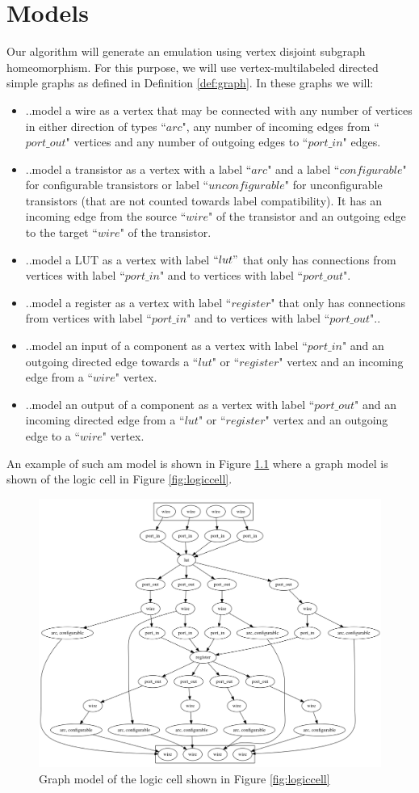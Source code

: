 \chapter{Models}
Our algorithm will generate an emulation using vertex disjoint subgraph homeomorphism. For this purpose, we will use vertex-multilabeled directed simple graphs as defined in Definition \ref{def:graph}. In these graphs we will:

\begin{itemize}
\item ..model a wire as a vertex that may be connected with any number of vertices in either direction of types ``$arc$", any number of incoming edges from ``$port\_out$" vertices and any number of outgoing edges to ``$port\_in$" edges.
\item ..model a transistor as a vertex with a label ``$arc$" and a label ``$configurable$" for configurable transistors or label ``$unconfigurable$" for unconfigurable transistors (that are not counted towards label compatibility). It has an incoming edge from the source ``$wire$" of the transistor and an outgoing edge to the target ``$wire$" of the transistor.
\item ..model a LUT as a vertex with label $``lut"$ that only has connections from vertices with label ``$port\_in$" and to vertices with label ``$port\_out$".
\item ..model a register as a vertex with label ``$register$" that only has connections from vertices with label ``$port\_in$" and to vertices with label ``$port\_out$"..
\item ..model an input of a component as a vertex with label ``$port\_in$" and an outgoing directed edge towards a ``$lut$" or ``$register$" vertex and an incoming edge from a ``$wire$" vertex.
\item ..model an output of a component as a vertex with label ``$port\_out$" and an incoming directed edge from a ``$lut$" or ``$register$" vertex and an outgoing edge to a ``$wire$" vertex.
\end{itemize}

An example of such am model is shown in Figure \ref{fig:graphmodel-logiccell} where a graph model is shown of the logic cell in Figure \ref{fig:logiccell}.

\begin{figure}
\includegraphics[width=\textwidth]{images/modelOfCell.png}
\caption{Graph model of the logic cell shown in Figure \ref{fig:logiccell}}
\label{fig:graphmodel-logiccell}
\end{figure}
